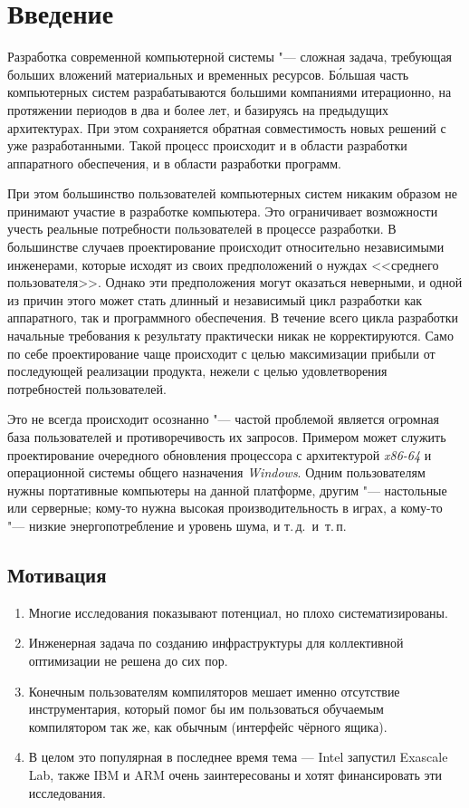 \section{Введение}
Разработка современной компьютерной системы "--- сложная задача, требующая больших вложений материальных и временных ресурсов. Б\'{о}льшая часть компьютерных систем разрабатываются большими компаниями итерационно, на протяжении периодов в два и более лет, и базируясь на предыдущих архитектурах. При этом сохраняется обратная совместимость новых решений с уже разработанными. Такой процесс происходит и в области разработки аппаратного обеспечения, и в области разработки программ.

При этом большинство пользователей компьютерных систем никаким образом не принимают участие в разработке компьютера. Это ограничивает возможности учесть реальные потребности пользователей в процессе разработки. В большинстве случаев проектирование происходит относительно независимыми инженерами, которые исходят из своих предположений о нуждах <<среднего пользователя>>. Однако эти предположения могут оказаться неверными, и одной из причин этого может стать длинный и независимый цикл разработки как аппаратного, так и программного обеспечения. В течение всего цикла разработки начальные требования к результату практически никак не корректируются. Само по себе проектирование чаще происходит с целью максимизации прибыли от последующей реализации продукта, нежели с целью удовлетворения потребностей пользователей.

Это не всегда происходит осознанно "--- частой проблемой является огромная база пользователей и противоречивость их запросов. Примером может служить проектирование очередного обновления процессора с архитектурой \textit{x86-64} и операционной системы общего назначения \textit{Windows}. Одним пользователям нужны портативные компьютеры на данной платформе, другим "--- настольные или серверные; кому-то нужна высокая производительность в играх, а кому-то "--- низкие энергопотребление и уровень шума, и т.\,д.~и~т.\,п.


\subsection{Мотивация}
\begin{enumerate}
\item Многие исследования показывают потенциал, но плохо систематизированы.
\item Инженерная задача по созданию инфраструктуры для коллективной оптимизации не решена до сих пор.
\item Конечным пользователям компиляторов мешает именно отсутствие инструментария, который помог бы им пользоваться обучаемым компилятором так же, как обычным (интерфейс чёрного ящика).
\item В целом это популярная в последнее время тема --- Intel запустил Exascale Lab, также IBM и ARM очень заинтересованы и хотят финансировать эти исследования.
\end{enumerate}

